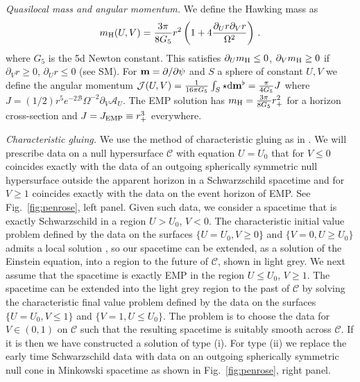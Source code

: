 \documentclass[prl,twocolumn,superscriptaddress,nofootinbib]{revtex4-2}
\begin{document}
{\it Quasilocal mass and angular momentum.} We define the Hawking mass as \cite{Dafermos:2005nh}
\begin{equation}
m_{\rm H}(U,V)=\frac{3\pi}{8G_5}r^2\left(1+4\frac{\partial_Ur\partial_Vr}{\Omega^2}\right)\,.
\label{eq:hm}
\end{equation}
where $G_5$ is the 5d Newton constant. This satisfies $\partial_U m_{\rm H} \le 0$, $\partial_V m_{\rm H} \ge 0$ if $\partial_V r \ge 0$, $\partial_U r \le 0$ (see SM). For ${\bf m} = \partial/\partial \psi$ and $S$ a sphere of constant $U,V$ we define the angular momentum $\mathcal{J}(U,V) = \frac{1}{16\pi G_5}\int_S \star {\rm d}{\bf m}^\flat=\frac{\pi}{4 G_5} J$ where $J = (1/2) r^5 e^{-2\mathcal{B}}\Omega^{-2} \partial_V \mathcal{A}_U$. The EMP solution has $m_{\rm H}=\frac{3\pi}{8 G_5}r_+^2$ for a horizon cross-section and $J = J_{\rm EMP} \equiv r_+^3$ everywhere.

{\it Characteristic gluing.} We use the method of characteristic gluing \cite{gluing} as in \cite{Kehle:2022uvc,Gadioux:2025unn}. We will prescribe data on a null hypersurface $\mathcal{C}$ with equation $U=U_0$ that for $V\le 0$ coincides exactly with the data of an outgoing spherically symmetric null hypersurface outside the apparent horizon in a Schwarzschild spacetime and for $V\ge 1$ coincides exactly with the data on the event horizon of EMP. See Fig.~\ref{fig:penrose}, left panel. Given such data, we consider a spacetime that is exactly Schwarzschild in a region $U>U_0$, $V<0$. The characteristic initial value problem defined by the data on the surfaces $\{U=U_0,V\ge 0\}$ and $\{V = 0,U \ge U_0\}$ admits a local solution \cite{characteristic}, so our spacetime can be extended, as a solution of the Einstein equation, into a region to the future of $\mathcal{C}$, shown in light grey. We next assume that the spacetime is exactly EMP in the region $U \le U_0$, $V \ge 1$. The spacetime can be extended into the light grey region to the past of $\mathcal{C}$ by solving the characteristic final value problem defined by the data on the surfaces $\{U=U_0,V \le 1\}$ and $\{V=1,U \le U_0\}$. The problem is to choose the data for $V \in (0,1)$ on $\mathcal{C}$ such that the resulting spacetime is suitably smooth across $\mathcal{C}$. If it is then we have constructed a solution of type (i). For type (ii) we replace the early time Schwarzschild data with data on an outgoing spherically symmetric null cone in Minkowski spacetime as shown in Fig.~\ref{fig:penrose}, right panel.
\end{document}
